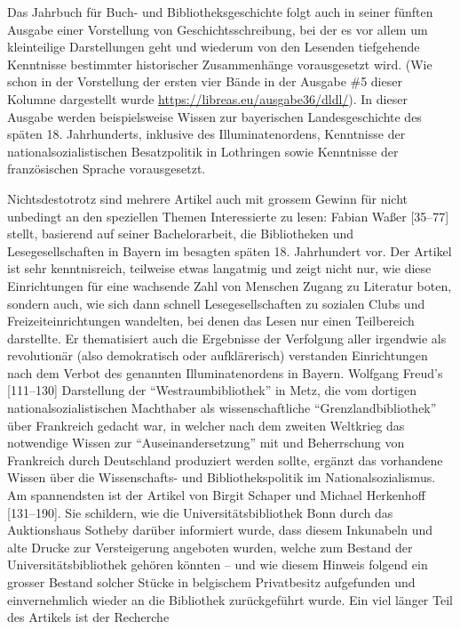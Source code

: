 \documentclass[a4paper,
fontsize=11pt,
oneside,
numbers=noperiodatend,
parskip=half-,
bibliography=totoc,
final
]{scrartcl}
\begin{document}
Das Jahrbuch für Buch- und Bibliotheksgeschichte folgt auch in seiner
fünften Ausgabe einer Vorstellung von Geschichtsschreibung, bei der es
vor allem um kleinteilige Darstellungen geht und wiederum von den
Lesenden tiefgehende Kenntnisse bestimmter historischer Zusammenhänge
vorausgesetzt wird. (Wie schon in der Vorstellung der ersten vier Bände
in der Ausgabe \#5 dieser Kolumne dargestellt wurde
\url{https://libreas.eu/ausgabe36/dldl/}). In dieser Ausgabe werden
beispielsweise Wissen zur bayerischen Landesgeschichte des späten 18.
Jahrhunderts, inklusive des Illuminatenordens, Kenntnisse der
nationalsozialistischen Besatzpolitik in Lothringen sowie Kenntnisse der
französischen Sprache vorausgesetzt.

Nichtsdestotrotz sind mehrere Artikel auch mit grossem Gewinn für nicht
unbedingt an den speziellen Themen Interessierte zu lesen: Fabian Waßer
{[}35--77{]} stellt, basierend auf seiner Bachelorarbeit, die
Bibliotheken und Lesegesellschaften in Bayern im besagten späten 18.
Jahrhundert vor. Der Artikel ist sehr kenntnisreich, teilweise etwas
langatmig und zeigt nicht nur, wie diese Einrichtungen für eine
wachsende Zahl von Menschen Zugang zu Literatur boten, sondern auch, wie
sich dann schnell Lesegesellschaften zu sozialen Clubs und
Freizeiteinrichtungen wandelten, bei denen das Lesen nur einen
Teilbereich darstellte. Er thematisiert auch die Ergebnisse der
Verfolgung aller irgendwie als revolutionär (also demokratisch oder
aufklärerisch) verstanden Einrichtungen nach dem Verbot des genannten
Illuminatenordens in Bayern. Wolfgang Freud's {[}111--130{]} Darstellung
der \enquote{Westraumbibliothek} in Metz, die vom dortigen
nationalsozialistischen Machthaber als wissenschaftliche
\enquote{Grenzlandbibliothek} über Frankreich gedacht war, in welcher
nach dem zweiten Weltkrieg das notwendige Wissen zur
\enquote{Auseinandersetzung} mit und Beherrschung von Frankreich durch
Deutschland produziert werden sollte, ergänzt das vorhandene Wissen über
die Wissenschafts- und Bibliothekspolitik im Nationalsozialismus. Am
spannendsten ist der Artikel von Birgit Schaper und Michael Herkenhoff
{[}131--190{]}. Sie schildern, wie die Universitätsbibliothek Bonn durch
das Auktionshaus Sotheby darüber informiert wurde, dass diesem
Inkunabeln und alte Drucke zur Versteigerung angeboten wurden, welche
zum Bestand der Universitätsbibliothek gehören könnten -- und wie diesem
Hinweis folgend ein grosser Bestand solcher Stücke in belgischem
Privatbesitz aufgefunden und einvernehmlich wieder an die Bibliothek
zurückgeführt wurde. Ein viel länger Teil des Artikels ist der Recherche
\end{document}
